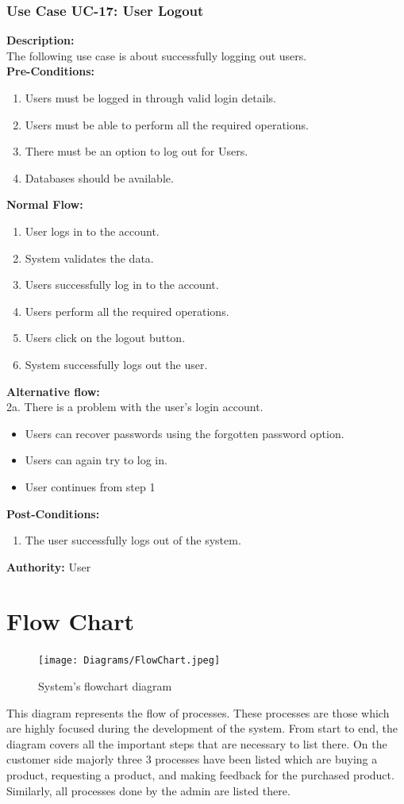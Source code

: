 \subsubsection{Use Case UC-17: User Logout }
\textbf{Description:}\\
The following use case is about successfully logging out users. 
\\
\textbf{Pre-Conditions:}
\begin{enumerate}
    \item Users must be logged in through valid login details.
  \item Users must be able to perform all the required operations. 
  \item There must be an option to log out for Users.
  \item Databases should be available. 
\end{enumerate}
\textbf{Normal Flow:}\\
\begin{enumerate}
\item User logs in to the account. 
\item System validates the data. 
\item Users successfully log in to the account. 
\item Users perform all the required operations. 
\item Users click on the logout button. 
\item System successfully logs out the user. 
\end{enumerate}
\textbf{Alternative flow: }\\
2a. There is a problem with the user’s login account. \begin{itemize}
\item Users can recover passwords using the forgotten password option. 
\item Users can again try to log in. 
\item User continues from step 1

\end{itemize}
\textbf{Post-Conditions: }
\begin{enumerate}
\item	The user successfully logs out of the system.
\end{enumerate}
\textbf{Authority:}
User
\section{Flow Chart}
\begin{figure}[H]
    \centering
    \texttt{[image: Diagrams/FlowChart.jpeg]}
    \caption{System’s flowchart diagram}
    \label{fig: System’s flowchart diagram}
    \end{figure}
    \justifying
    This diagram represents the flow of processes. These processes are those which are highly focused during the development of the system. From start to end, the diagram covers all the important steps that are necessary to list there. On the customer side majorly three 3 processes have been listed which are buying a product, requesting a product, and making feedback for the purchased product. Similarly, all processes done by the admin are listed there.

